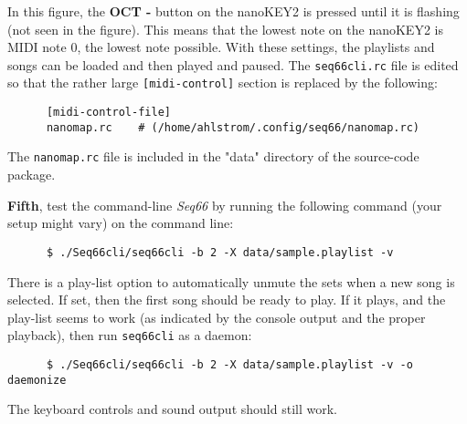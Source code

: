    In this figure, the \textbf{OCT -} button on the nanoKEY2 is pressed until
   it is flashing (not seen in the figure).
   This means that the lowest note on the nanoKEY2 is MIDI note 0, the lowest
   note possible.  With these settings, the playlists and songs can be loaded
   and then played and paused.
   The \texttt{seq66cli.rc} file is edited so that the rather large
   \texttt{[midi-control]} section is replaced by the following:

   \begin{verbatim}
      [midi-control-file]
      nanomap.rc    # (/home/ahlstrom/.config/seq66/nanomap.rc)
   \end{verbatim}

   The \texttt{nanomap.rc} file is included in the "data" directory of the
   source-code package.

   \textbf{Fifth}, test the command-line \textsl{Seq66} by running the
   following command (your setup might vary) on the command line:

   \begin{verbatim}
      $ ./Seq66cli/seq66cli -b 2 -X data/sample.playlist -v
   \end{verbatim}

   There is a play-list option to automatically unmute the sets when a new song
   is selected.  If set, then the first song should be ready to play.
   If it plays, and the play-list seems to work (as indicated by the console
   output and the proper playback), then run \texttt{seq66cli} as a daemon:

   \begin{verbatim}
      $ ./Seq66cli/seq66cli -b 2 -X data/sample.playlist -v -o daemonize
   \end{verbatim}

   The keyboard controls and sound output should still work.

